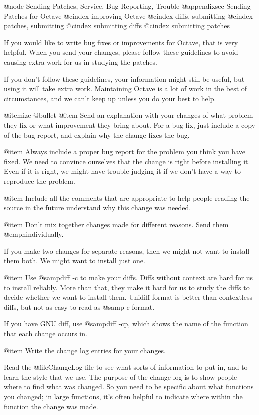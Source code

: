 @node Sending Patches, Service, Bug Reporting, Trouble
@appendixsec Sending Patches for Octave
@cindex improving Octave
@cindex diffs, submitting
@cindex patches, submitting
@cindex submitting diffs
@cindex submitting patches

If you would like to write bug fixes or improvements for Octave, that is
very helpful.  When you send your changes, please follow these
guidelines to avoid causing extra work for us in studying the patches.

If you don't follow these guidelines, your information might still be
useful, but using it will take extra work.  Maintaining Octave is a lot
of work in the best of circumstances, and we can't keep up unless you do
your best to help.

@itemize @bullet
@item
Send an explanation with your changes of what problem they fix or what
improvement they bring about.  For a bug fix, just include a copy of the
bug report, and explain why the change fixes the bug.

@item
Always include a proper bug report for the problem you think you have
fixed.  We need to convince ourselves that the change is right before
installing it.  Even if it is right, we might have trouble judging it if
we don't have a way to reproduce the problem.

@item
Include all the comments that are appropriate to help people reading the
source in the future understand why this change was needed.

@item
Don't mix together changes made for different reasons.
Send them @emph{individually}.

If you make two changes for separate reasons, then we might not want to
install them both.  We might want to install just one.

@item
Use @samp{diff -c} to make your diffs.  Diffs without context are hard
for us to install reliably.  More than that, they make it hard for us to
study the diffs to decide whether we want to install them.  Unidiff
format is better than contextless diffs, but not as easy to read as
@samp{-c} format.

If you have GNU diff, use @samp{diff -cp}, which shows the name of the
function that each change occurs in.

@item
Write the change log entries for your changes.

Read the @file{ChangeLog} file to see what sorts of information to put
in, and to learn the style that we use.  The purpose of the change log
is to show people where to find what was changed.  So you need to be
specific about what functions you changed; in large functions, it's
often helpful to indicate where within the function the change was made.

